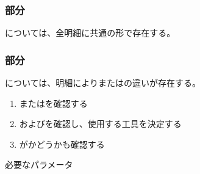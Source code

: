\subsubsection{\EndFacecut 部分}
\EndFacecutMilling については、全明細に共通の形で存在する。

\subsubsection{\Outcut 部分}
\OutcutMilling については、明細により\OutcutExists または\OutcutType の違いが存在する。
\begin{enumerate}[label=\sarrow]
\item \TopOutcutExists または\BottomOutcutExists を確認する
\item \TopOutcutType および\BottomOutcutType を確認し、使用する工具を決定する
\item \nameOutcut が\CurvedOutcut かどうかも確認する
\end{enumerate}
\begin{Parameter}{必要なパラメータ}
\PMTopOutcutExists%
\PMBottomOutcutExists%
\PMTopOutcutType%
\PMBottomOutcutType%
\end{Parameter}

